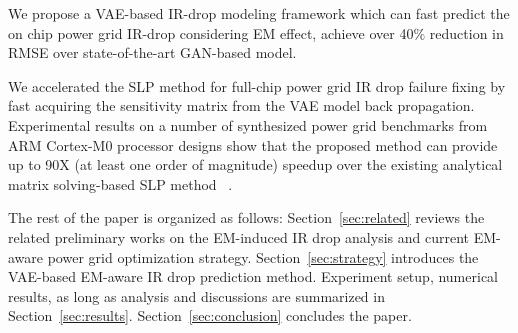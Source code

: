 \begin{itemlist}
\item We propose a VAE-based IR-drop modeling framework which can fast predict the on chip power grid IR-drop considering EM effect, achieve over 40$\%$ reduction in RMSE over state-of-the-art GAN-based model.

\item We accelerated the SLP method for full-chip power grid IR drop failure fixing by fast acquiring the sensitivity matrix from the VAE model back propagation. 
 Experimental results on a number of synthesized power grid benchmarks from ARM Cortex-M0 processor designs show that the proposed method can provide up to 90X (at least one order of magnitude) speedup over the existing analytical matrix solving-based SLP method ~\cite{Sukharev:2019pg}.
 
\end{itemlist}

The rest of the paper is organized as follows:
Section~\ref{sec:related} reviews the related preliminary works on the
EM-induced IR drop analysis and current EM-aware power grid
optimization strategy. Section~\ref{sec:strategy} introduces the
VAE-based EM-aware IR drop prediction method. Experiment setup, numerical results, as long as
analysis and discussions are summarized in Section~\ref{sec:results}.
Section~\ref{sec:conclusion} concludes the paper.
